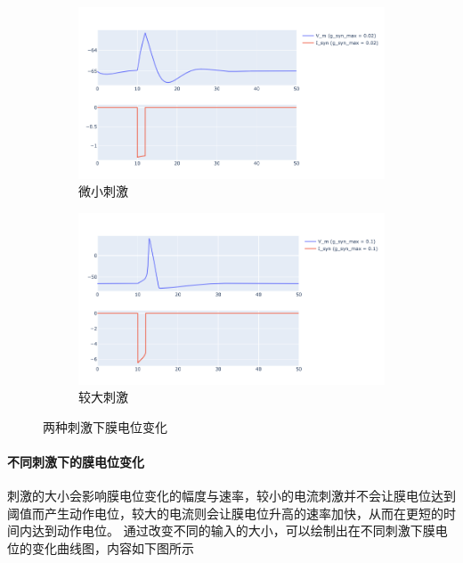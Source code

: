 \documentclass[nols, a4paper]{tufte-handout}
\begin{document}
\begin{figure}[htbp]
    \centering
    \begin{subfigure}[t]{0.45\linewidth}
        \centering
        \includegraphics[width=\linewidth]{image/littleSTI.png}
        \caption{微小刺激}
    \end{subfigure}
    \hfill
    \begin{subfigure}[t]{0.45\linewidth}
        \centering
        \includegraphics[width=\linewidth]{image/largeSTI.png}
        \caption{较大刺激}
    \end{subfigure}
    \caption{两种刺激下膜电位变化}
    \label{fig:input}
\end{figure}

\paragraph{不同刺激下的膜电位变化}
刺激的大小会影响膜电位变化的幅度与速率，较小的电流刺激并不会让膜电位达到阈值而产生动作电位，较大的电流则会让膜电位升高的速率加快，从而在更短的时间内达到动作电位。
通过改变不同的输入的大小，可以绘制出在不同刺激下膜电位的变化曲线图，内容如下图所示
\end{document}
